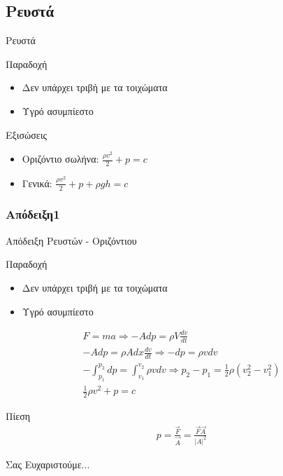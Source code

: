 \documentclass[greek]{beamer}
\begin{document}
\subsection{Ρευστά}
\begin{frame}{Ρευστά}
  \begin{block}{Παραδοχή}
    \begin{itemize}
      \item Δεν υπάρχει τριβή με τα τοιχώματα
      \item Υγρό ασυμπίεστο
    \end{itemize}
  \end{block}
  Εξισώσεις
  \begin{itemize}
    \item<1-> Οριζόντιο σωλήνα: $\displaystyle \frac{ρv^2}{2}+p=c$
    \item<2-> Γενικά: $\displaystyle \frac{ρv^2}{2}+p+ρgh=c$
  \end{itemize}
\end{frame}

\subsubsection{Απόδειξη1}
\begin{frame}{Απόδειξη Ρευστών - Οριζόντιου}
  \begin{block}{Παραδοχή}
    \begin{itemize}
      \item Δεν υπάρχει τριβή με τα τοιχώματα
      \item Υγρό ασυμπίεστο
    \end{itemize}
  \end{block}
  \begin{gather*}
   F=ma \Rightarrow -Adp=ρV\frac{dv}{dt} \\
   -Adp=ρAdx\frac{dv}{dt} \Rightarrow -dp=ρv dv \\
   -\int_{p_1}^{p_2}dp=\int_{v_1}^{v_2}{ρv}dv \Rightarrow  p_2-p_1=\frac{1}{2}ρ(v_2^2-v_1^2) \\
   \frac{1}{2}ρv^2+p=c
  \end{gather*}
\end{frame}

\begin{frame}{Πίεση}
  \begin{gather*}
    p=\frac{\vec{F}}{\vec{A}}=\frac{\vec{F}\vec{A}}{\left| A \right|^2}
  \end{gather*}
\end{frame}

\begin{frame}[plain,c]
  \begin{center}
    \Huge Σας Ευχαριστούμε...
  \end{center}
\end{frame}
\end{document}

